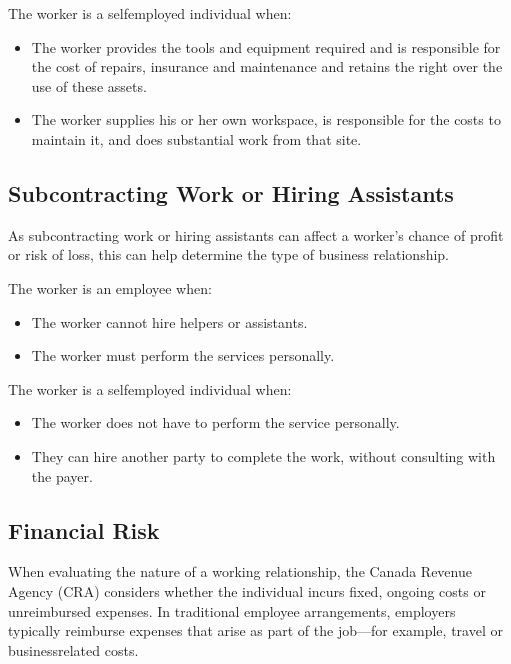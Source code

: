 \documentclass[letterpaper,10pt,english]{sphinxmanual}
\begin{document}
\sphinxAtStartPar
The worker is a self\sphinxhyphen{}employed individual when:
\begin{itemize}
\item {} 
\sphinxAtStartPar
The worker provides the tools and equipment required and is responsible for the cost of repairs, insurance and maintenance and retains the right over the use of these assets.

\item {} 
\sphinxAtStartPar
The worker supplies his or her own workspace, is responsible for the costs to maintain it, and does substantial work from that site.

\end{itemize}


\subsection{Subcontracting Work or Hiring Assistants}
\label{\detokenize{3_contracts:subcontracting-work-or-hiring-assistants}}
\sphinxAtStartPar
As subcontracting work or hiring assistants can affect a worker’s chance of profit or risk of loss, this can help determine
the type of business relationship.

\sphinxAtStartPar
The worker is an employee when:
\begin{itemize}
\item {} 
\sphinxAtStartPar
The worker cannot hire helpers or assistants.

\item {} 
\sphinxAtStartPar
The worker must perform the services personally.

\end{itemize}

\sphinxAtStartPar
The worker is a self\sphinxhyphen{}employed individual when:
\begin{itemize}
\item {} 
\sphinxAtStartPar
The worker does not have to perform the service personally.

\item {} 
\sphinxAtStartPar
They can hire another party to complete the work, without consulting with the payer.

\end{itemize}


\subsection{Financial Risk}
\label{\detokenize{3_contracts:financial-risk}}
\sphinxAtStartPar
When evaluating the nature of a working relationship, the Canada Revenue Agency (CRA) considers whether the individual
incurs fixed, ongoing costs or unreimbursed expenses. In traditional employee arrangements, employers typically reimburse
expenses that arise as part of the job—for example, travel or business\sphinxhyphen{}related costs.
\end{document}
